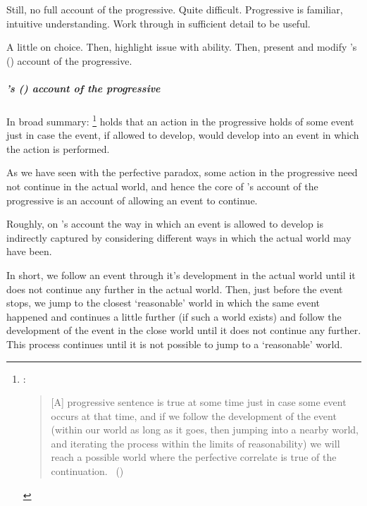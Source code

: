 \begin{note}
  Still, no full account of the progressive.
  Quite difficult.
  Progressive is familiar, intuitive understanding.
  Work through in sufficient detail to be useful.

  A little on choice.
  Then, highlight issue with ability.
  Then, present and modify \citeauthor{Landman:1992wh}'s (\citeyear{Landman:1992wh}) account of the progressive.
\end{note}

\subparagraph{\citeauthor{Landman:1992wh}'s (\citeyear{Landman:1992wh}) account of the progressive}
\label{cha:sec:fcs-def:progressive-landman}
\nocite{Portner:1998um}
\nocite{Engelberg:1999vi}

\begin{note}
  In broad summary:%
  \footnote{
    \textcite{Szabo:2004ul}:
  \begin{quote}
    [A] progressive sentence is true at some time just in case some event occurs at that time, and if we follow the development of the event (within our world as long as it goes, then jumping into a nearby world, and iterating the process within the limits of reasonability) we will reach a possible world where the perfective correlate is true of the continuation.%
    \mbox{ }\hfill\mbox{(\citeyear[34]{Szabo:2004ul})}
  \end{quote}
  }
  \citeauthor{Landman:1992wh} holds that an action in the progressive holds of some event just in case the event, if allowed to develop, would develop into an event in which the action is performed.

  As we have seen with the perfective paradox, some action in the progressive need not continue in the actual world, and hence the core of \citeauthor{Landman:1992wh}'s account of the progressive is an account of allowing an event to continue.

  Roughly, on \citeauthor{Landman:1992wh}'s account the way in which an event is allowed to develop is indirectly captured by considering different ways in which the actual world may have been.

  In short, we follow an event through it's development in the actual world until it does not continue any further in the actual world.
  Then, just before the event stops, we jump to the closest `reasonable' world in which the same event happened and continues a little further (if such a world exists) and follow the development of the event in the close world until it does not continue any further.
  This process continues until it is not possible to jump to a `reasonable' world.
\end{note}

